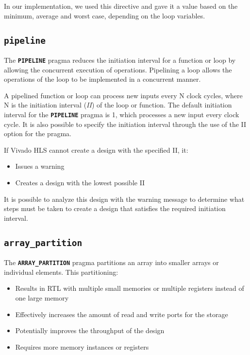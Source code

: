 In our implementation, we used this directive and gave it a value based on the minimum, average and worst case, depending on the loop variables.

\subsection{\texttt{pipeline}}

The \texttt{\textbf{PIPELINE}} pragma reduces the initiation interval for a function or loop by allowing the concurrent execution of operations. Pipelining a loop allows the operations of the loop to be implemented in a concurrent manner.

A pipelined function or loop can process new inputs every N clock cycles, where N is the initiation interval (\textit{II}) of the loop or function. The default initiation interval for the \texttt{\textbf{PIPELINE}} pragma is 1, which processes a new input every clock cycle. It is also possible to specify the initiation interval through the use of the II option for the pragma.

If Vivado HLS cannot create a design with the specified II, it:
\begin{itemize}[noitemsep]
	\item Issues a warning
	\item Creates a design with the lowest possible II
\end{itemize}

It is possible to analyze this design with the warning message to determine what steps must be taken to create a design that satisfies the required initiation interval.

\newpage
\subsection{\texttt{array\_partition}}

The \texttt{\textbf{ARRAY\_PARTITION}} pragma partitions an array into smaller arrays or individual elements. This partitioning:
\begin{itemize}[noitemsep]
	\item Results in RTL with multiple small memories or multiple registers instead of one large memory
	\item Effectively increases the amount of read and write ports for the storage
	\item Potentially improves the throughput of the design
	\item Requires more memory instances or registers
\end{itemize}

